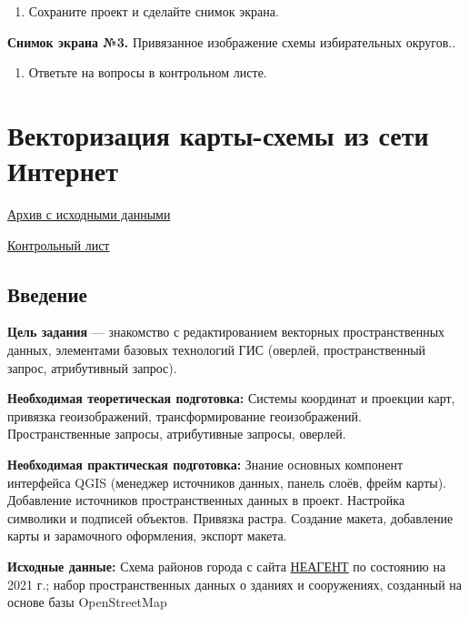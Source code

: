 \documentclass[
  12pt,
]{book}
\providecommand{\tightlist}{%
  \setlength{\itemsep}{0pt}\setlength{\parskip}{0pt}}
\begin{document}
\begin{enumerate}
\def\labelenumi{\arabic{enumi}.}
\setcounter{enumi}{11}
\tightlist
\item
  Сохраните проект и сделайте снимок экрана.
\end{enumerate}

\textbf{Снимок экрана №3.} Привязанное изображение схемы избирательных округов..

\begin{enumerate}
\def\labelenumi{\arabic{enumi}.}
\setcounter{enumi}{12}
\tightlist
\item
  Ответьте на вопросы в контрольном листе.
\end{enumerate}

\hypertarget{digitizing-districts}{%
\chapter{Векторизация карты-схемы из сети Интернет}\label{digitizing-districts}}

\href{https://github.com/aentin/qgis-course/raw/master/files/Ex06.zip}{Архив с исходными данными}

\href{https://github.com/aentin/qgis-course/raw/master/files/Ex06_\%D0\%BE\%D1\%82\%D1\%87\%D1\%91\%D1\%82.docx}{Контрольный лист}

\hypertarget{digitizing-intro}{%
\section{Введение}\label{digitizing-intro}}

\textbf{Цель задания} --- знакомство с редактированием векторных пространственных данных, элементами базовых технологий ГИС (оверлей, пространственный запрос, атрибутивный запрос).

\textbf{Необходимая теоретическая подготовка:} Системы координат и проекции карт, привязка геоизображений, трансформирование геоизображений. Пространственные запросы, атрибутивные запросы, оверлей.

\textbf{Необходимая практическая подготовка:} Знание основных компонент интерфейса QGIS (менеджер источников данных, панель слоёв, фрейм карты). Добавление источников пространственных данных в проект. Настройка символики и подписей объектов. Привязка растра. Создание макета, добавление карты и зарамочного оформления, экспорт макета.

\textbf{Исходные данные:} Схема районов города с сайта \href{https://neagent.info/}{НЕАГЕНТ} по состоянию на 2021 г.; набор пространственных данных о зданиях и сооружениях, созданный на основе базы OpenStreetMap
\end{document}
